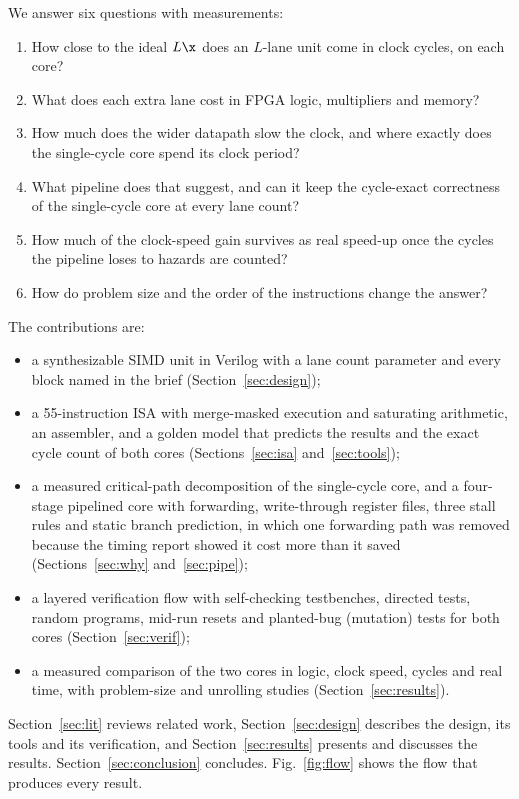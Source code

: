 We answer six questions with measurements:
\begin{enumerate}
\item How close to the ideal $L\x$ does an $L$-lane unit come in clock cycles, on each
      core?
\item What does each extra lane cost in FPGA logic, multipliers and memory?
\item How much does the wider datapath slow the clock, and where exactly does the
      single-cycle core spend its clock period?
\item What pipeline does that suggest, and can it keep the cycle-exact correctness of
      the single-cycle core at every lane count?
\item How much of the clock-speed gain survives as real speed-up once the cycles the
      pipeline loses to hazards are counted?
\item How do problem size and the order of the instructions change the answer?
\end{enumerate}

The contributions are:
\begin{itemize}
\item a synthesizable SIMD unit in Verilog with a lane count parameter and every block
      named in the brief (Section~\ref{sec:design});
\item a 55-instruction ISA with merge-masked execution and saturating arithmetic, an
      assembler, and a golden model that predicts the results and the exact cycle
      count of both cores (Sections~\ref{sec:isa} and~\ref{sec:tools});
\item a measured critical-path decomposition of the single-cycle core, and a
      four-stage pipelined core with forwarding, write-through register files, three
      stall rules and static branch prediction, in which one forwarding path was
      removed because the timing report showed it cost more than it saved
      (Sections~\ref{sec:why} and~\ref{sec:pipe});
\item a layered verification flow with self-checking testbenches, directed tests,
      random programs, mid-run resets and planted-bug (mutation) tests for both cores
      (Section~\ref{sec:verif});
\item a measured comparison of the two cores in logic, clock speed, cycles and real
      time, with problem-size and unrolling studies (Section~\ref{sec:results}).
\end{itemize}

Section~\ref{sec:lit} reviews related work, Section~\ref{sec:design} describes the
design, its tools and its verification, and Section~\ref{sec:results} presents and
discusses the results. Section~\ref{sec:conclusion} concludes. Fig.~\ref{fig:flow}
shows the flow that produces every result.

